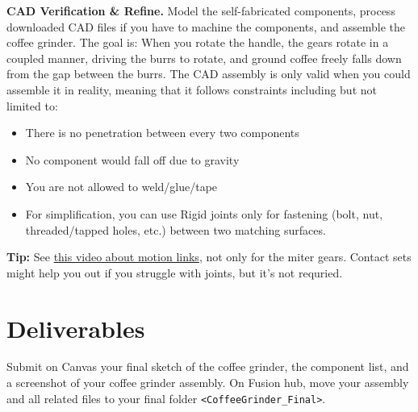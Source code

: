\documentclass[11pt]{article}
\begin{document}
\textbf{CAD Verification \& Refine.} Model the self-fabricated components, process downloaded CAD files if you have to machine the components, and assemble the coffee grinder.
The goal is: When you rotate the handle, the gears rotate in a coupled manner, driving the burrs to rotate, and ground coffee freely falls down from the gap between the burrs.
The CAD assembly is only valid when you could assemble it in reality, meaning that it follows constraints including but not limited to: 
\begin{itemize}
    \item There is no penetration between every two components
    \item No component would fall off due to gravity
    \item You are not allowed to weld/glue/tape
    \item For simplification, you can use Rigid joints only for fastening (bolt, nut, threaded/tapped holes, etc.) between two matching surfaces.
\end{itemize}
\textbf{Tip:} See \href{https://www.youtube.com/watch?v=1jbkHboGHNo}{this video about motion links}, not only for the miter gears.
Contact sets might help you out if you struggle with joints, but it's not requried.

\section{Deliverables}
Submit on Canvas your final sketch of the coffee grinder, the component list, and a screenshot of your coffee grinder assembly.
On Fusion hub, move your assembly and all related files to your final folder \texttt{<CoffeeGrinder\_Final>}. 

\end{document}
